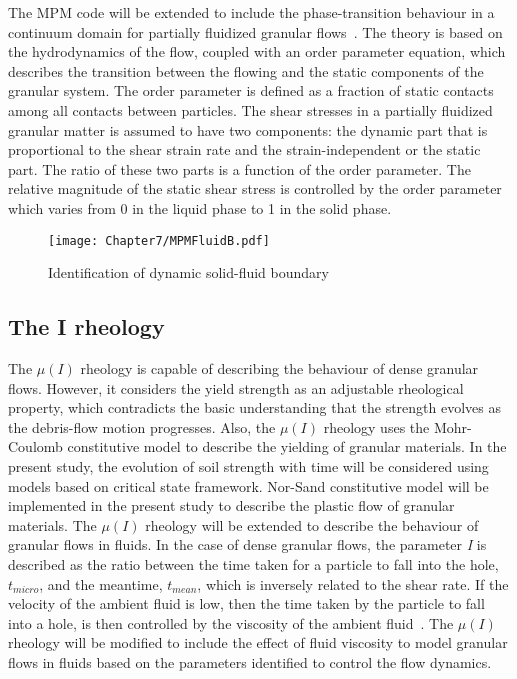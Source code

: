 The MPM code will be extended to include the phase-transition behaviour in a 
continuum domain for partially fluidized granular flows~\citep{Aranson2002, 
Aranson2001, Volfson2003}. The theory is based on the hydrodynamics of the 
flow, coupled with an order parameter equation, which describes the transition 
between the flowing and the static components of the granular system. The order 
parameter is defined as a fraction of static contacts among all contacts 
between particles. The shear stresses in a partially fluidized granular matter 
is assumed to have two components: the dynamic part that is proportional to the 
shear strain rate and the strain-independent or the static part. The ratio of 
these two parts is a function of the order parameter. The relative magnitude of 
the static shear stress is controlled by the order parameter which varies from 
0 in the liquid phase to 1 in the solid phase.

\begin{figure}[htbp]
\centering
\texttt{[image: Chapter7/MPMFluidB.pdf]}
\caption{Identification of dynamic solid-fluid boundary}
\label{fig:MPMFluidB}
\end{figure}

\subsection{The I rheology}

The $\mu(I)$ rheology is capable of describing the behaviour of dense granular 
flows. However, it considers the yield strength as an adjustable rheological 
property, which contradicts the basic understanding that the
strength evolves as the debris-flow motion progresses. Also, the $\mu(I)$ 
rheology uses the Mohr-Coulomb constitutive model to describe the yielding of 
granular materials. In the present study, the evolution of soil strength 
with time will be considered using models based on critical state framework. 
Nor-Sand constitutive model will be implemented in the present study to 
describe the plastic flow of granular materials. The $\mu(I)$ rheology will be 
extended to describe the behaviour of granular flows in fluids. In the case of 
dense granular flows, the parameter \textit{I} is described as the ratio 
between the time taken for a particle to fall into the hole, $t_{micro}$, and 
the meantime, $t_{mean}$, which is inversely related to the shear rate. If the 
velocity of the ambient fluid is low, then the time taken by the particle to 
fall into a hole, is then controlled by the viscosity of the ambient 
fluid~\citep{Pouliquen2005}. The $\mu(I)$ rheology will be modified to include 
the effect of fluid viscosity to model granular flows in fluids based on the 
parameters identified to control the flow dynamics.
